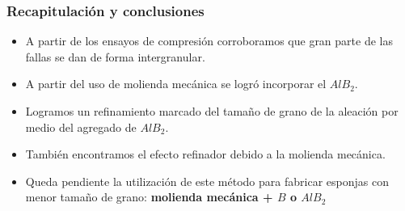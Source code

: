 \documentclass[usenames,dvipsnames]{beamer}
\begin{document}

\begin{frame}
\frametitle{Recapitulación y conclusiones}
\begin{small}
\begin{itemize}
 \item A partir de los ensayos de compresión corroboramos que gran parte de las fallas se dan de forma intergranular. 
 \item A partir del uso de molienda mecánica se logró incorporar el $AlB_2$. 
 \item Logramos un refinamiento marcado del tamaño de grano de la aleación por medio del agregado de $AlB_2$.
 \item También encontramos el efecto refinador debido a la molienda mecánica.  
 \item Queda pendiente la utilización de este método para fabricar esponjas con menor tamaño de grano: \textbf{molienda mecánica + $B$ o $AlB_2$}
\end{itemize}
\end{small}

\end{frame}
\end{document}
